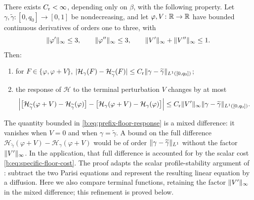 \begin{lemma}\label{lem:fr-prefix-response}
There exists $C_{\rm r}<\infty$, depending only on $\beta$, with the following property. Let $\gamma,\widetilde\gamma\colon[0,q_0]\to[0,1]$ be nondecreasing, and let $\varphi,V\colon\mathbb R\to\mathbb R$ have bounded continuous derivatives of orders one to three, with
\[
 \lVert \varphi'\rVert_\infty\le3,\qquad\lVert \varphi''\rVert_\infty\le3,\qquad\lVert V'\rVert_\infty+\lVert V''\rVert_\infty\le1.
\]
Then:
\begin{enumerate}[label=\textup{(\alph*)}]
\item for $F\in\{\varphi,\varphi+V\}$, $\lvert \mathcal H_\gamma(F)-\mathcal H_{\widetilde\gamma}(F)\rvert\le C_{\rm r}\lVert \gamma-\widetilde\gamma\rVert_{L^1([0,q_0])}$;
\item the response of $\mathcal H$ to the terminal perturbation $V$ changes by at most
\begin{equation}\label{b:eq:prefix-floor-response}
 \Bigl|\bigl[\mathcal H_{\widetilde\gamma}(\varphi+V)-\mathcal H_{\widetilde\gamma}(\varphi)\bigr]-\bigl[\mathcal H_\gamma(\varphi+V)-\mathcal H_\gamma(\varphi)\bigr]\Bigr|
 \le C_{\rm r}\lVert V'\rVert_\infty\lVert \gamma-\widetilde\gamma\rVert_{L^1([0,q_0])}.
\end{equation}
\end{enumerate}
\end{lemma}

The quantity bounded in \eqref{b:eq:prefix-floor-response} is a mixed difference: it vanishes when $V=0$ and when $\gamma=\widetilde\gamma$. A bound on the full difference $\mathcal H_{\widetilde\gamma}(\varphi+V)-\mathcal H_\gamma(\varphi+V)$ would be of order $\lVert \gamma-\widetilde\gamma\rVert_{L^1}$ without the factor $\lVert V'\rVert_\infty$. In the application, that full difference is accounted for by the scalar cost \eqref{b:eq:specific-floor-cost}.
The proof adapts the scalar profile-stability argument of
\cite[Section~2.4, Lemma~14]{jagannath-tobasco-2016}: subtract the two Parisi
equations and represent the resulting linear equation by a diffusion. Here we
also compare terminal functions, retaining the factor $\lVert V'\rVert_\infty$ in the
mixed difference; this refinement is proved below.

